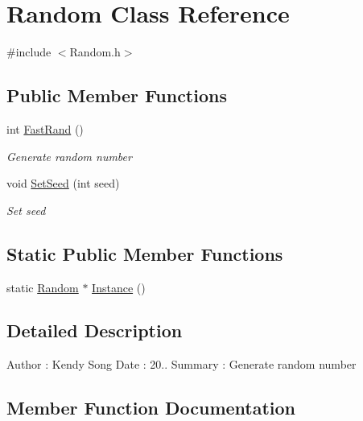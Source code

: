 \hypertarget{class_random}{}\section{Random Class Reference}
\label{class_random}


{\ttfamily \#include $<$Random.\+h$>$}

\subsection*{Public Member Functions}
\begin{DoxyCompactItemize}
\item 
int \mbox{\hyperlink{class_random_aaebe8a0ae675187387c6494050a02883}{Fast\+Rand}} ()
\begin{DoxyCompactList}\small\item\em Generate random number \end{DoxyCompactList}\item 
void \mbox{\hyperlink{class_random_aea2f96bdfb95f2aabba9a94c0f9b40f1}{Set\+Seed}} (int seed)
\begin{DoxyCompactList}\small\item\em Set seed \end{DoxyCompactList}\end{DoxyCompactItemize}
\subsection*{Static Public Member Functions}
\begin{DoxyCompactItemize}
\item 
static \mbox{\hyperlink{class_random}{Random}} $\ast$ \mbox{\hyperlink{class_random_a817cdd2cdb1509a70853b041bccdd97f}{Instance}} ()
\end{DoxyCompactItemize}


\subsection{Detailed Description}
Author \+: Kendy Song Date \+: 20.. Summary \+: Generate random number 

\subsection{Member Function Documentation}
\mbox{\label{class_random_aaebe8a0ae675187387c6494050a02883}} 
